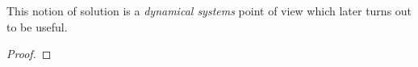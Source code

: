 \documentclass[10pt]{article}
\begin{document}
This notion of solution is a \emph{dynamical systems} point of view which later turns out to be useful.


\begin{lemma}
    \label{lemma-continuity}

\end{lemma}

\begin{proof}
\end{proof}
\end{document}
